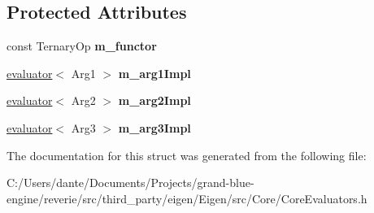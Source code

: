 \subsection*{Protected Attributes}
\begin{DoxyCompactItemize}
\item 
\mbox{\label{struct_eigen_1_1internal_1_1ternary__evaluator_3_01_cwise_ternary_op_3_01_ternary_op_00_01_arg1_daf42d21bcfee99cfa54e03ffa9506fc_aba9185a8f6ae515aac3192f1ea535524}} 
const Ternary\+Op {\bfseries m\+\_\+functor}
\item 
\mbox{\label{struct_eigen_1_1internal_1_1ternary__evaluator_3_01_cwise_ternary_op_3_01_ternary_op_00_01_arg1_daf42d21bcfee99cfa54e03ffa9506fc_a4627778cb5d6ffacea7c4fb94fd00e5c}} 
\mbox{\hyperlink{struct_eigen_1_1internal_1_1evaluator}{evaluator}}$<$ Arg1 $>$ {\bfseries m\+\_\+arg1\+Impl}
\item 
\mbox{\label{struct_eigen_1_1internal_1_1ternary__evaluator_3_01_cwise_ternary_op_3_01_ternary_op_00_01_arg1_daf42d21bcfee99cfa54e03ffa9506fc_a5422647a81b9cc39c15dfaf5faec48ab}} 
\mbox{\hyperlink{struct_eigen_1_1internal_1_1evaluator}{evaluator}}$<$ Arg2 $>$ {\bfseries m\+\_\+arg2\+Impl}
\item 
\mbox{\label{struct_eigen_1_1internal_1_1ternary__evaluator_3_01_cwise_ternary_op_3_01_ternary_op_00_01_arg1_daf42d21bcfee99cfa54e03ffa9506fc_a5e25e47c3d7bb27103a101a97d0fb769}} 
\mbox{\hyperlink{struct_eigen_1_1internal_1_1evaluator}{evaluator}}$<$ Arg3 $>$ {\bfseries m\+\_\+arg3\+Impl}
\end{DoxyCompactItemize}


The documentation for this struct was generated from the following file\+:\begin{DoxyCompactItemize}
\item 
C\+:/\+Users/dante/\+Documents/\+Projects/grand-\/blue-\/engine/reverie/src/third\+\_\+party/eigen/\+Eigen/src/\+Core/Core\+Evaluators.\+h\end{DoxyCompactItemize}
